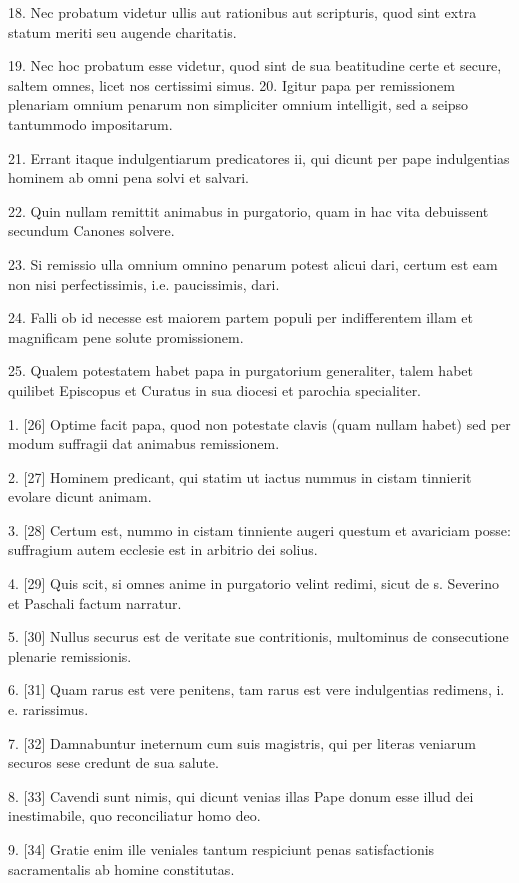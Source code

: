 18. Nec probatum videtur ullis aut rationibus aut scripturis, quod sint
extra statum meriti seu augende charitatis.

19. Nec hoc probatum esse videtur, quod sint de sua beatitudine certe
et secure, saltem omnes, licet nos certissimi simus. 20. Igitur papa
per remissionem plenariam omnium penarum non simpliciter omnium
intelligit, sed a seipso tantummodo impositarum.

21. Errant itaque indulgentiarum predicatores ii, qui dicunt per pape
indulgentias hominem ab omni pena solvi et salvari.

22. Quin nullam remittit animabus in purgatorio, quam in hac vita
debuissent secundum Canones solvere.

23. Si remissio ulla omnium omnino penarum potest alicui dari, certum
est eam non nisi perfectissimis, i.e. paucissimis, dari.

24. Falli ob id necesse est maiorem partem populi per indifferentem
illam et magnificam pene solute promissionem.

25. Qualem potestatem habet papa in purgatorium generaliter, talem
habet quilibet Episcopus et Curatus in sua diocesi et parochia
specialiter.

1. [26] Optime facit papa, quod non potestate clavis (quam nullam
habet) sed per modum suffragii dat animabus remissionem.

2. [27] Hominem predicant, qui statim ut iactus nummus in cistam
tinnierit evolare dicunt animam.

3. [28] Certum est, nummo in cistam tinniente augeri questum et
avariciam posse: suffragium autem ecclesie est in arbitrio dei solius.

4. [29] Quis scit, si omnes anime in purgatorio velint redimi, sicut de
s. Severino et Paschali factum narratur.

5. [30] Nullus securus est de veritate sue contritionis, multominus de
consecutione plenarie remissionis.

6. [31] Quam rarus est vere penitens, tam rarus est vere indulgentias
redimens, i. e. rarissimus.

7. [32] Damnabuntur ineternum cum suis magistris, qui per literas
veniarum securos sese credunt de sua salute.

8. [33] Cavendi sunt nimis, qui dicunt venias illas Pape donum esse
illud dei inestimabile, quo reconciliatur homo deo.

9. [34] Gratie enim ille veniales tantum respiciunt penas
satisfactionis sacramentalis ab homine constitutas.

